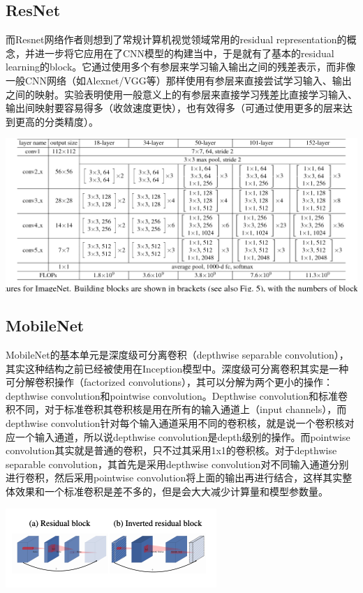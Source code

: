 \documentclass[UTF8]{ctexart}
\begin{document}
\subsection{ResNet}而Resnet\cite{10.1007/978-3-319-46493-0_38}网络作者则想到了常规计算机视觉领域常用的residual representation的概念，并进一步将它应用在了CNN模型的构建当中，于是就有了基本的residual learning的block。它通过使用多个有参层来学习输入输出之间的残差表示，而非像一般CNN网络（如Alexnet/VGG等）那样使用有参层来直接尝试学习输入、输出之间的映射。实验表明使用一般意义上的有参层来直接学习残差比直接学习输入、输出间映射要容易得多（收敛速度更快），也有效得多（可通过使用更多的层来达到更高的分类精度）。
\begin{center}
\includegraphics[scale=0.3]{resnet.png}
\end{center}
\subsection{MobileNet}
MobileNet\cite{Sandler_2018}的基本单元是深度级可分离卷积（depthwise separable convolution），其实这种结构之前已经被使用在Inception模型中。深度级可分离卷积其实是一种可分解卷积操作（factorized convolutions），其可以分解为两个更小的操作：depthwise convolution和pointwise convolution。Depthwise convolution和标准卷积不同，对于标准卷积其卷积核是用在所有的输入通道上（input channels），而depthwise convolution针对每个输入通道采用不同的卷积核，就是说一个卷积核对应一个输入通道，所以说depthwise convolution是depth级别的操作。而pointwise convolution其实就是普通的卷积，只不过其采用1x1的卷积核。对于depthwise separable convolution，其首先是采用depthwise convolution对不同输入通道分别进行卷积，然后采用pointwise convolution将上面的输出再进行结合，这样其实整体效果和一个标准卷积是差不多的，但是会大大减少计算量和模型参数量。
\begin{center}
\includegraphics[scale=0.5]{mobilenet_v2_1.png}
\end{center}
\end{document}
